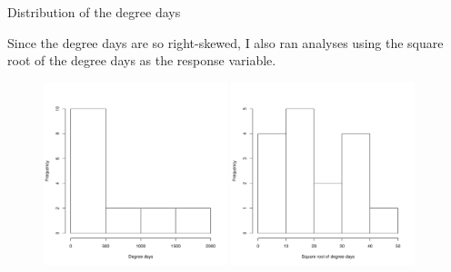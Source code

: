 \documentclass{beamer}
\begin{document}
\begin{frame}{Distribution of the degree days}

  {\scriptsize
  
    \noindent Since the degree days are so right-skewed, I also ran
    analyses using the square root of the degree days as the response
    variable.

    
\begin{figure}
  \includegraphics[width=2.1in]{degdays_all_time_steps_hist}
  \includegraphics[width=2.1in]{sqrt_degdays_all_time_steps_hist}
\end{figure}
  }
  
\end{frame}
\end{document}
